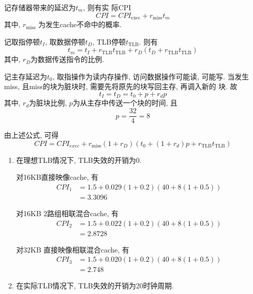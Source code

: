 \begin{solve}
  记存储器带来的延迟为$t_m$, 则有实
  际CPI
  \begin{equation}
    CPI = CPI_{\mathrm{exec}} + r_{\mathrm{miss}}t_m
  \end{equation}
  其中, $r_{\mathrm{miss}}$ 为发生cache不命中的概率.
  
  记取指停顿$t_I$, 取数据停顿$t_D$,
  TLB停顿$t_{\mathrm{TLB}}$. 则有
  \begin{equation}
    t_m = t_I + r_{\mathrm{TLB}}t_{\mathrm{TLB}} + r_D(t_D  + r_{\mathrm{TLB}}t_{\mathrm{TLB}})
  \end{equation}
  其中, $r_D$为数据传送指令的比例.

  记主存延迟为$t_0$, 取指操作为读内存操作, 访问数据操作可能读, 可能写.
  当发生miss, 且miss的块为脏块时, 需要先将原先的块写回主存, 再调入新的
  块. 故
  \begin{equation}
    t_I = t_D = t_0 + p + r_dp
  \end{equation}
  其中, $r_d$为脏块比例, $p$为从主存中传送一个块的时间, 且
  \begin{equation}
    p = \frac{32}{4} = 8
  \end{equation}

  由上述公式, 可得
  \begin{equation}
    CPI = CPI_{exec} + r_{\mathrm{miss}} (1+r_D)(t_0 + (1+r_d)p + r_{\mathrm{TLB}}t_{\mathrm{TLB}})
  \end{equation}


  \begin{enumerate}
  \item 在理想TLB情况下, TLB失效的开销为0.

    对16KB直接映像cache, 有
    \begin{align*}
      CPI_1 &= 1.5 + 0.029 (1+0.2) (40 + 8(1 + 0.5))\\
      &= 3.3096
    \end{align*}

    对16KB 2路组相联混合cache, 有
    \begin{align*}
      CPI_2 &= 1.5 + 0.022 (1+0.2) (40 + 8(1 + 0.5))\\
      &= 2.8728
    \end{align*}

    对32KB 直接映像相联混合cache, 有
    \begin{align*}
      CPI_3 &= 1.5 + 0.020 (1+0.2) (40 + 8(1 + 0.5))\\
      &= 2.748
    \end{align*}
  \item 在实际TLB情况下, TLB失效的开销为20时钟周期.


\end{enumerate}
\end{solve}
